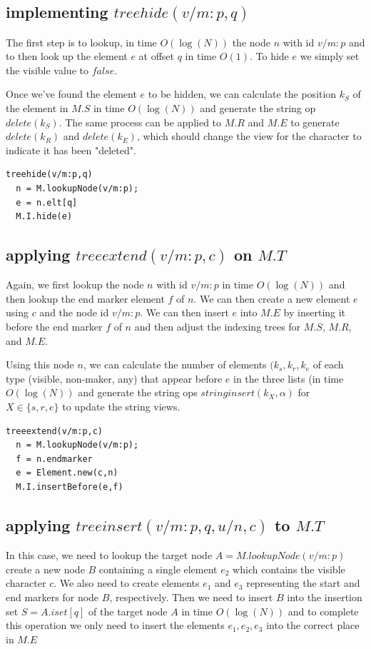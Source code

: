 \documentclass{amsart}
\begin{document}
\subsection{implementing $treehide(v/m:p,q)$}
The first step is to lookup, in time $O(\log(N))$ the node $n$ with id $v/m:p$
and to then look up the element $e$ at offset $q$ in time $O(1)$. 
To hide $e$ we simply set the visible value to $false$.

Once we've found the element $e$ to be hidden, we can
calculate the position $k_S$ of the element in $M.S$ in time $O(\log(N))$
and generate the string op $delete(k_S)$. The same process can be applied to
$M.R$ and $M.E$ to generate $delete(k_R)$ and $delete(k_E)$, which should
change the view for the character to indicate it has been "deleted".

\begin{verbatim}
treehide(v/m:p,q)
  n = M.lookupNode(v/m:p);
  e = n.elt[q]
  M.I.hide(e)
\end{verbatim}


\subsection{applying $treeextend(v/m:p,c)$ on $M.T$}
Again, we first lookup the node $n$ with id $v/m:p$ in time $O(\log(N))$ and then lookup the 
end marker element $f$ of $n$. We can then create a new element $e$
using $c$ and the node id $v/m:p$. We can then insert $e$ into
$M.E$ by inserting it before the end marker $f$ of $n$ and then adjust 
the indexing trees for $M.S$, $M.R$, and $M.E$.

Using this node $n$, we can calculate the number
of elements $(k_s,k_r,k_e$ of each type (visible, non-maker, any) that appear before $e$ in
the three lists (in time $O(\log(N))$ and generate the string ops $stringinsert(k_X,\alpha)$ for $X \in \{s,r,e\}$ to update the string views.

\begin{verbatim}
treeextend(v/m:p,c)
  n = M.lookupNode(v/m:p);
  f = n.endmarker
  e = Element.new(c,n)
  M.I.insertBefore(e,f)
\end{verbatim}

\subsection{applying $treeinsert(v/m:p,q,u/n,c)$ to $M.T$}
In this case, we need to lookup the target node $A = M.lookupNode(v/m:p)$ create a new node $B$ containing a single element
$e_2$ which contains the visible character $c$. We also need to create elements $e_1$ and $e_3$ representing the start and end markers for node $B$, respectively.
Then we need to insert $B$
into the insertion set $S=A.iset[q]$ of the target node $A$ in time $O(\log(N))$ 
and to complete this operation we only need to insert the elements $e_1,e_2,e_3$ into the correct place in $M.E$
\end{document}
